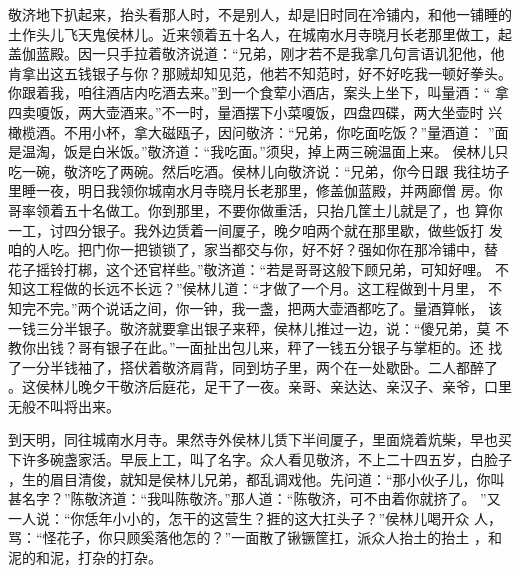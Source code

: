 敬济地下扒起来，抬头看那人时，不是别人，却是旧时同在冷铺内，和他一铺睡的
土作头儿飞天鬼侯林儿。近来领着五十名人，在城南水月寺晓月长老那里做工，起
盖伽蓝殿。因一只手拉着敬济说道：“兄弟，刚才若不是我拿几句言语讥犯他，他
肯拿出这五钱银子与你？那贼却知见范，他若不知范时，好不好吃我一顿好拳头。
你跟着我，咱往酒店内吃酒去来。”到一个食荤小酒店，案头上坐下，叫量酒：“
拿四卖嗄饭，两大壶酒来。”不一时，量酒摆下小菜嗄饭，四盘四碟，两大坐壶时
兴橄榄酒。不用小杯，拿大磁瓯子，因问敬济：“兄弟，你吃面吃饭？”量酒道：
”面是温淘，饭是白米饭。”敬济道：“我吃面。”须臾，掉上两三碗温面上来。
侯林儿只吃一碗，敬济吃了两碗。然后吃酒。侯林儿向敬济说：“兄弟，你今日跟
我往坊子里睡一夜，明日我领你城南水月寺晓月长老那里，修盖伽蓝殿，并两廊僧
房。你哥率领着五十名做工。你到那里，不要你做重活，只抬几筐土儿就是了，也
算你一工，讨四分银子。我外边赁着一间厦子，晚夕咱两个就在那里歇，做些饭打
发咱的人吃。把门你一把锁锁了，家当都交与你，好不好？强如你在那冷铺中，替
花子摇铃打梆，这个还官样些。”敬济道：“若是哥哥这般下顾兄弟，可知好哩。
不知这工程做的长远不长远？”侯林儿道：“才做了一个月。这工程做到十月里，
不知完不完。”两个说话之间，你一钟，我一盏，把两大壶酒都吃了。量酒算帐，
该一钱三分半银子。敬济就要拿出银子来秤，侯林儿推过一边，说：“傻兄弟，莫
不教你出钱？哥有银子在此。”一面扯出包儿来，秤了一钱五分银子与掌柜的。还
找了一分半钱袖了，搭伏着敬济肩背，同到坊子里，两个在一处歇卧。二人都醉了
。这侯林儿晚夕干敬济后庭花，足干了一夜。亲哥、亲达达、亲汉子、亲爷，口里
无般不叫将出来。

到天明，同往城南水月寺。果然寺外侯林儿赁下半间厦子，里面烧着炕柴，早也买
下许多碗盏家活。早辰上工，叫了名字。众人看见敬济，不上二十四五岁，白脸子
，生的眉目清俊，就知是侯林儿兄弟，都乱调戏他。先问道：“那小伙子儿，你叫
甚名字？”陈敬济道：“我叫陈敬济。”那人道：“陈敬济，可不由着你就挤了。
”又一人说：“你恁年小小的，怎干的这营生？捱的这大扛头子？”侯林儿喝开众
人，骂：“怪花子，你只顾奚落他怎的？”一面散了锹镢筐扛，派众人抬土的抬土
，和泥的和泥，打杂的打杂。

